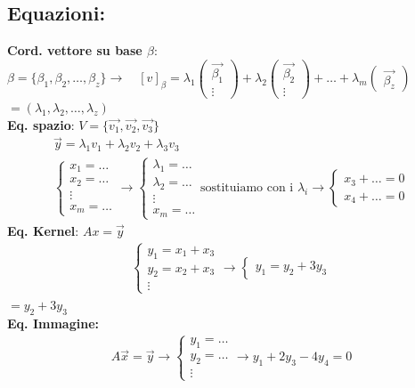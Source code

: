 \documentclass{article}
\begin{document}
\subsection*{Equazioni: }
\textbf{Cord. vettore su base $\beta$}:\\
$\beta=\{\beta_1,\beta_2,\dots,\beta_z\} \to\quad [v]_\beta=\lambda_1\begin{pmatrix}
    \vec{\beta_1} \\
    \vdots
\end{pmatrix}+\lambda_2 \begin{pmatrix}
    \vec{\beta_2} \\
    \vdots
\end{pmatrix}+\dots+\lambda_m\begin{pmatrix}
    \vec{\beta_z}
\end{pmatrix}$ \\
$=(\lambda_1,\lambda_2,\dots,\lambda_z)$ \\
\textbf{Eq. spazio}: $V=\{\vec{v_1},\vec{v_2},\vec{v_3}\}$ \\
\begin{align}
    \vec{y}=\lambda_1 v_1 + \lambda_2 v_2 + \lambda_3 v_3 \\
    \begin{cases}
        x_1= \dots \\
        x_2= \dots \\
        \vdots \\
        x_m= \dots
    \end{cases} \to     \begin{cases}
        \lambda_1= \dots \\
        \lambda_2= \dots \\
        \vdots \\
        x_m= \dots
    \end{cases}
    \text{sostituiamo con i $\lambda_i$} \to \begin{cases}
        \boxed{x_3+\dots=0}\\
        \boxed{x_4+\dots=0}
    \end{cases}
\end{align}
\textbf{Eq. Kernel}: $Ax=\vec{y}$
\begin{align}
    \begin{cases}
        y_1=x_1+x_3\\
        y_2=x_2+x_3\\
        \vdots
    \end{cases} \to \begin{cases}
        y_1=y_2+3y_3
    \end{cases}
\end{align}
$=y_2+3y_3$ \\
\textbf{Eq. Immagine:} 
\begin{align}
    A\vec{x}=\vec{y}
    \to \begin{cases}
        y_1=\dots\\
        y_2=\dots\\
        \vdots
    \end{cases} \to \boxed{y_1+2y_3-4y_4=0}
\end{align}
\end{document}
